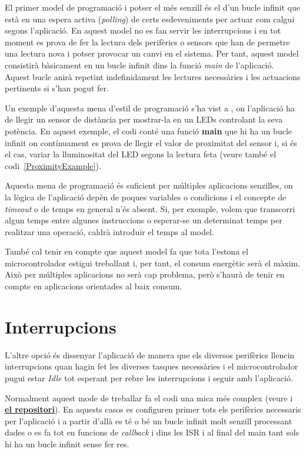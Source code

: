 El primer model de programació i potser el més senzill és el d'un bucle infinit que està en una espera activa ({\em polling}) de certs esdeveniments per actuar com calgui segons l'aplicació. En aquest model no es fan servir les interrupcions i en tot moment es prova de fer la lectura dels perifèrics o sensors que han de permetre una lectura nova i potser provocar un canvi en el sistema. Per tant, aquest model consistirà bàsicament en un bucle infinit dins la funció {\em main} de l'aplicació. Aquest bucle anirà repetint indefinidament les lectures necessàries i les actuacions pertinents si s'han pogut fer.

Un exemple d'aquesta mena d'estil de programació s'ha vist a , on l'aplicació ha de llegir un sensor de distància per mostrar-la en un LEDs controlant la seva potència. En aquest exemple, el codi conté una funció {\bf main} que hi ha un bucle infinit on contínuament es prova de llegir el valor de proximitat del sensor i, si és el cas, variar la lluminositat del LED segons la lectura feta (veure també el codi~\ref{ProximityExample}).

Aquesta mena de programació és suficient per múltiples aplicacions senzilles, on la lògica de l'aplicació depèn de poques variables o condicions i el concepte de {\em timeout} o de temps en general n'és absent. Si, per exemple, volem que transcorri algun temps entre algunes instruccions o esperar-se un determinat temps per realitzar una operació, caldrà introduir el temps al model.

També cal tenir en compte que aquest model fa que tota l'estona el microcontrolador estigui treballant i, per tant, el consum energètic serà el màxim. Això per múltiples aplicacions no serà cap problema, però s'haurà de tenir en compte en aplicacions orientades al baix consum.

\section{Interrupcions}
\label{sec:interrupcions}

L'altre opció és dissenyar l'aplicació de manera que els diversos perifèrics llencin interrupcions quan hagin fet les diverses tasques necessàries i el microcontrolador pugui estar {\em Idle} tot esperant per rebre les interrupcions i seguir amb l'aplicació.

Normalment aquest mode de treballar fa el codi una mica més complex (veure  i \href{https://github.com/mariusmm/cursembedded/tree/master/Simplicity/GPIO_2}{\bf el repositori}). En aquests casos es configuren primer tots els perifèrics necessaris per l'aplicació i a partir d'allà es té o bé un bucle infinit molt senzill processant dades o es fa tot en funcions de {\em callback} i dins les \gls{ISR} i al final del main tant sols hi ha un bucle infinit sense fer res.

